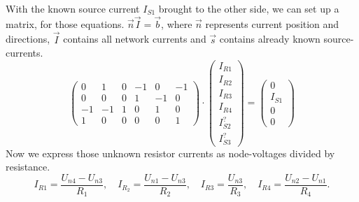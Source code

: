 \documentclass[a4paper]{article}
\begin{document}
{With the known source current $I_{S1}$ brought to the other side, we can set up a matrix, for those
equations. $\vec{n}\vec{I} = \vec{b}$, where $\vec{n}$ represents current position and directions,
$\vec{I}$ contains all network currents and  $\vec{s}$ contains already known source-currents.
\begin{equation}
   \begin{pmatrix}
      0 & 1 & 0 & -1 & 0 & -1 \\
      0 & 0 & 0 & 1 & -1 & 0  \\
      -1 & -1 & 1 & 0 & 1 & 0 \\
      1 & 0 & 0 & 0 & 0 & 1  
   \end{pmatrix}
   \cdot
   \begin{pmatrix}
       I_{R1} \\ I_{R2} \\ I_{R3} \\ I_{R4} \\ I_{S2}^? \\ I_{S3}^? 
   \end{pmatrix}
   =
   \begin{pmatrix}
      0 \\ I_{S1} \\ 0 \\ 0  
   \end{pmatrix}
   \label{eqn:nodes}
\end{equation}
Now we express those unknown resistor currents as node-voltages divided by resistance.
\[
   I_{R1} = \frac{U_{n4} - U_{n3}}{R_1}, \quad I_{R_2} = \frac{U_{n1} - U_{n3}}{R_2}, \quad
   I_{R3} = \frac{U_{n3}}{R_3}, \quad I_{R4} = \frac{U_{n2} - U_{n1}}{R_4}
.\]

\newpage

}
\end{document}
